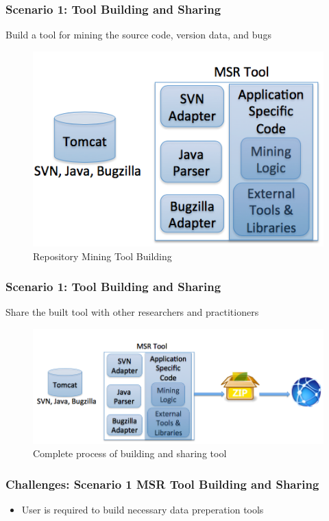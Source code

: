         \begin{frame}
            \frametitle{Scenario 1: Tool Building and Sharing}
            Build a tool for mining the source code, version data, and bugs
            \begin{figure}
                \centering
                \includegraphics[width=0.60\linewidth]{figures/tomcat-tool.png}
                \caption{Repository Mining Tool Building}
            \end{figure}
        \end{frame}

        \begin{frame}
            \frametitle{Scenario 1: Tool Building and Sharing}
            Share the built tool with other researchers and practitioners
            \begin{figure}
                \centering
                \includegraphics[width=0.85\linewidth]{figures/tomcat-sharing.png}
                \caption{Complete process of building and sharing tool}
            \end{figure}
        \end{frame}

        \begin{frame}
            \frametitle{Challenges: Scenario 1 MSR Tool Building and Sharing}
             \begin{itemize}
                \item User is required to build necessary data preperation tools
             \end{itemize}
        \end{frame}


